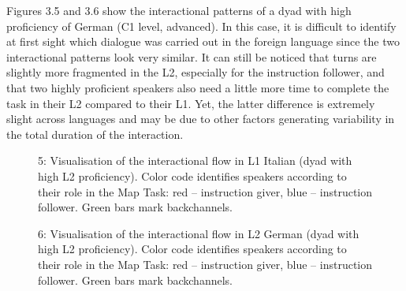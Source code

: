 Figures 3.5 and 3.6 show the interactional patterns of a dyad with high proficiency of German (C1 level, advanced). In this case, it is difficult to identify at first sight which dialogue was carried out in the foreign language since the two interactional patterns look very similar. It can still be noticed that turns are slightly more fragmented in the L2, especially for the instruction follower, and that two highly proficient speakers also need a little more time to complete the task in their L2 compared to their L1. Yet, the latter difference is extremely slight across languages and may be due to other factors generating variability in the total duration of the interaction.

\begin{stylecaption}
  
 
\end{stylecaption}

\begin{stylecaption}\begin{figure}
\caption{5: Visualisation of the interactional flow in L1 Italian (dyad with high L2 proficiency). Color code identifies speakers according to their role in the Map Task: red – instruction giver, blue – instruction follower. Green bars mark backchannels.}
\label{fig:key:3}
\end{figure}\end{stylecaption}

  
 

\begin{stylecaption}\begin{figure}
\caption{6: Visualisation of the interactional flow in L2 German (dyad with high L2 proficiency). Color code identifies speakers according to their role in the Map Task: red – instruction giver, blue – instruction follower. Green bars mark backchannels.}
\label{fig:key:3}
\end{figure}\end{stylecaption}

